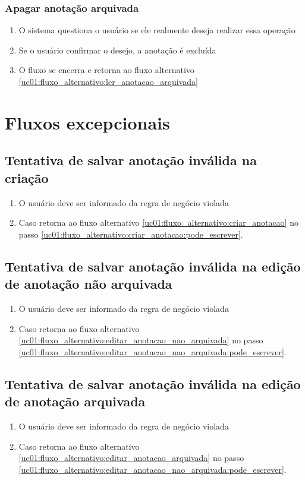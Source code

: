 \documentclass[
	12pt,				%
	oneside,			%
	a4paper,			%
	english,			%
	brazil,				%
	]{abntex2}
\begin{document}
\subsubsection{Apagar anotação arquivada} \label{uc01:fluxo_alternativo:apagar_anotacao_arquivada}
\begin{enumerate}
    \item O sistema questiona o usuário se ele realmente deseja realizar essa operação
    \item Se o usuário confirmar o desejo, a anotação é excluída
    \item O fluxo se encerra e retorna ao fluxo alternativo \ref{uc01:fluxo_alternativo:ler_anotacao_arquivada}
\end{enumerate}

\section{Fluxos excepcionais}

\subsection{Tentativa de salvar anotação inválida na criação} \label{uc01:fluxo_excepcional:criacao_invalida}
\begin{enumerate}
    \item O usuário deve ser informado da regra de negócio violada
    \item Caso retorna ao fluxo alternativo \ref{uc01:fluxo_alternativo:criar_anotacao} no passo \ref{uc01:fluxo_alternativo:criar_anotacao:pode_escrever}.
\end{enumerate}

\subsection{Tentativa de salvar anotação inválida na edição de anotação não arquivada} \label{uc01:fluxo_excepcional:edicao_nao_arquivada_invalida}
\begin{enumerate}
    \item O usuário deve ser informado da regra de negócio violada
    \item Caso retorna ao fluxo alternativo \ref{uc01:fluxo_alternativo:editar_anotacao_nao_arquivada} no passo \ref{uc01:fluxo_alternativo:editar_anotacao_nao_arquivada:pode_escrever}.
\end{enumerate}

\subsection{Tentativa de salvar anotação inválida na edição de anotação arquivada} \label{uc01:fluxo_excepcional:edicao_arquivada_invalida}
\begin{enumerate}
    \item O usuário deve ser informado da regra de negócio violada
    \item Caso retorna ao fluxo alternativo \ref{uc01:fluxo_alternativo:editar_anotacao_arquivada} no passo \ref{uc01:fluxo_alternativo:editar_anotacao_nao_arquivada:pode_escrever}.
\end{enumerate}
\end{document}
